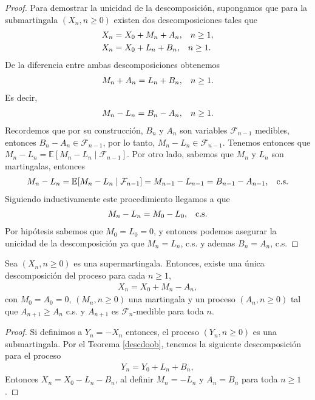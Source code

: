 \begin{proof}
	Para demostrar la unicidad de la descomposición, supongamos que para la submartingala $(X_n, n \geq 0)$ existen dos descomposiciones tales que
	\begin{align*}
		X_n &= X_0 + M_n + A_n, \hspace{0.3cm} n \geq 1, \\
		X_n &= X_0 + L_n + B_n, \hspace{0.3cm} n \geq 1.
	\end{align*}
	De la diferencia entre ambas descomposiciones obtenemos
	\begin{align*}
		M_n + A_n = L_n + B_n, \hspace{0.3cm} n \geq 1.
	\end{align*}
	Es decir, 
	\begin{align*}
		M_n - L_n = B_n - A_n, \hspace{0.3cm} n \geq 1.
	\end{align*}
	Recordemos que por su construcción, $B_n$ y $A_n$ son variables $\mathcal{F}_{n-1}$ medibles, entonces $B_n - A_n \in \mathcal{F}_{n-1}$, por lo tanto, $M_n - L_n \in \mathcal{F}_{n-1}$. Tenemos entonces que $M_n - L_n = \mathbb{E}[M_n - L_n \mid \mathcal{F}_{n-1}]$. Por otro lado, sabemos que $M_n$ y $L_n$ son martingalas, entonces
	\begin{align*}
		M_n - L_n = \mathbb{E}[M_n - L_n \mid \mathcal{F}_{n-1}] = M_{n-1} - L_{n-1} = B_{n-1} - A_{n-1}, \hspace{0.3cm} \text{c.s.}
	\end{align*}
	Siguiendo inductivamente este procedimiento llegamos a que
	\begin{align*}
		M_n - L_n = M_0 - L_0, \hspace{0.3cm} \text{c.s.}
	\end{align*}
	Por hipótesis sabemos que $M_0 = L_0 = 0$, y entonces podemos asegurar la unicidad de la descomposición ya que $M_n = L_n$, c.s. y ademas $B_n = A_n$, c.s.
\end{proof}

\begin{corollary}
	Sea $(X_n, n \geq 0)$ es una supermartingala. Entonces, existe una única descomposición del proceso para cada $n \geq 1$,
	\begin{align*}
		X_n = X_0 + M_n - A_n,
	\end{align*}
	con $M_0 = A_0 = 0$, $(M_n, n \geq 0)$ una martingala y un proceso $(A_n, n \geq 0)$ tal que $A_{n+1} \geq A_n$ c.s. y $A_{n+1}$ es $\mathcal{F}_n$-medible para toda $n$.
\end{corollary}
\begin{proof}
	Si definimos a $Y_n = - X_n$ entonces, el proceso $(Y_n, n \geq 0)$ es una submartingala. Por el Teorema \ref{descdoob}, tenemos la siguiente descomposición para el proceso
	\begin{align*}
		Y_n = Y_0 + L_n + B_n,
	\end{align*}
Entonces $X_n = X_0 - L_n - B_n$, al definir $M_n = - L_n$ y $A_n = B_n$ para toda $n \geq 1$.
\end{proof}

